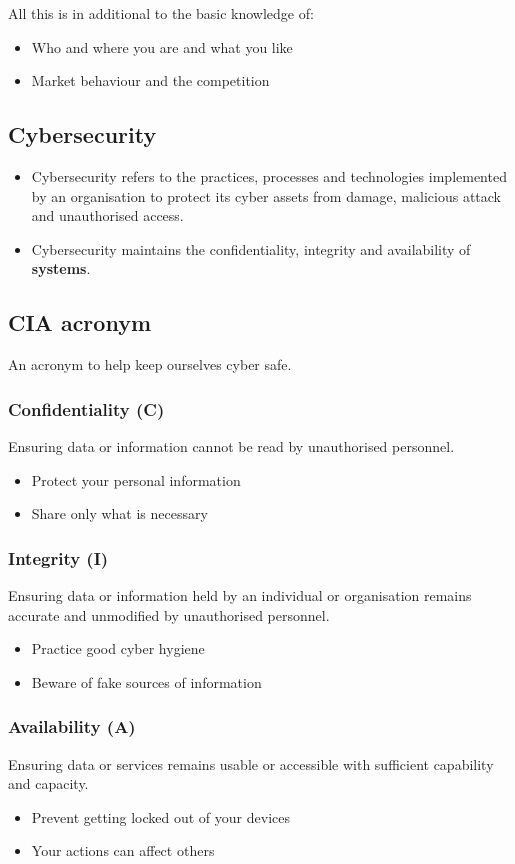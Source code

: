 \documentclass[11pt]{article}
\begin{document}
All this is in additional to the basic knowledge of:
\begin{itemize}
\item Who and where you are and what you like
\item Market behaviour and the competition
\end{itemize}
\subsection{Cybersecurity}
\label{sec:org7b41a2f}
\begin{itemize}
\item Cybersecurity refers to the practices, processes and technologies implemented by an organisation to protect its cyber assets from damage, malicious attack and unauthorised access.
\item Cybersecurity maintains the confidentiality, integrity and availability of \textbf{systems}.
\end{itemize}
\subsection{CIA acronym}
\label{sec:org3e22492}
An acronym to help keep ourselves cyber safe.
\subsubsection{Confidentiality (C)}
\label{sec:org54167e7}
Ensuring data or information cannot be read by unauthorised personnel.
\begin{itemize}
\item Protect your personal information
\item Share only what is necessary
\end{itemize}
\subsubsection{Integrity (I)}
\label{sec:orgebb5382}
Ensuring data or information held by an individual or organisation remains accurate and unmodified by unauthorised personnel.
\begin{itemize}
\item Practice good cyber hygiene
\item Beware of fake sources of information
\end{itemize}
\subsubsection{Availability (A)}
\label{sec:org2969c46}
Ensuring data or services remains usable or accessible with sufficient capability and capacity.
\begin{itemize}
\item Prevent getting locked out of your devices
\item Your actions can affect others
\end{itemize}
\end{document}
